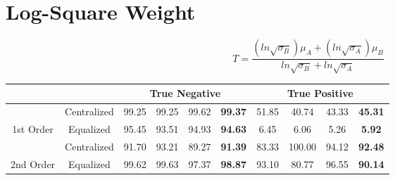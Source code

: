 \documentclass[10pt,a4paper]{article}
\begin{document}
	\section{Log-Square Weight}
		$$T = \frac{(ln\sqrt{\sigma_B})\mu_A + (ln\sqrt{\sigma_A})\mu_B}{ln\sqrt{\sigma_B} + ln\sqrt{\sigma_A}}$$
		\begin{table}[!h]
			\centering
			\begin{tabular}{|c|c|c|c|c|c|c|c|c|c|}
				\hline
				&             & \multicolumn{4}{c|}{True Negative}                            & \multicolumn{4}{c|}{True Positive}                             \\ \hline
				& Centralized & 99.25 & 99.25 & 99.62 & {\color[HTML]{FE0000} \textbf{99.37}} & 51.85 & 40.74  & 43.33 & {\color[HTML]{FE0000} \textbf{45.31}} \\ \cline{2-10} 
				\multirow{-2}{*}{1st Order} & Equalized   & 95.45 & 93.51 & 94.93 & {\color[HTML]{FE0000} \textbf{94.63}} & 6.45  & 6.06   & 5.26  & {\color[HTML]{FE0000} \textbf{5.92}}  \\ \hline
				& Centralized & 91.70 & 93.21 & 89.27 & {\color[HTML]{FE0000} \textbf{91.39}} & 83.33 & 100.00 & 94.12 & {\color[HTML]{FE0000} \textbf{92.48}} \\ \cline{2-10} 
				\multirow{-2}{*}{2nd Order} & Equalized   & 99.62 & 99.63 & 97.37 & {\color[HTML]{FE0000} \textbf{98.87}} & 93.10 & 80.77  & 96.55 & {\color[HTML]{FE0000} \textbf{90.14}} \\ \hline
			\end{tabular}
		\end{table}
	
\end{document}
